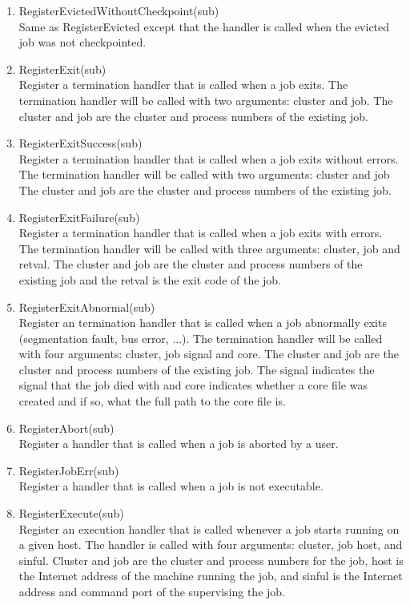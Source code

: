 \begin{enumerate}
	\item RegisterEvictedWithoutCheckpoint(sub) \\
	Same as RegisterEvicted except that the handler is called when the
	evicted job was not checkpointed.

	\item RegisterExit(sub) \\
	Register a termination handler that is called when a job exits.
	The termination handler will be called with two arguments: cluster and
	job. The cluster and job are the cluster and process numbers of the
	existing job. 
	
	\item RegisterExitSuccess(sub) \\
	Register a termination handler that is called when a job exits without
	errors. The termination handler will be called with two arguments: 
	cluster and job  The cluster and job are the cluster and process
	numbers of the existing job. 

	\item RegisterExitFailure(sub) \\
	Register a termination handler that is called when a job exits with 
	errors. The termination handler will be called with three arguments:
	cluster, job and retval. The cluster and job are the cluster 
	and process numbers of the existing job and the retval is the exit
	code of the job.

	\item RegisterExitAbnormal(sub) \\
	Register an termination handler that is called when a job abnormally
	exits (segmentation fault, bus error, ...). The termination handler
	will be called with four arguments: cluster, job  signal and
	core. The cluster and job are the cluster and process numbers of 
	the existing job. The signal indicates the signal that the job
	died with and core indicates whether a core file was created and if 
	so, what the full path to the core file is.

	\item RegisterAbort(sub) \\
	Register a handler that is called when a job is aborted by a user.

	\item RegisterJobErr(sub) \\
	Register a handler that is called when a job is not executable.

	\item RegisterExecute(sub) \\
	Register an execution handler that is called whenever a job starts
	running on a given host.  The handler is called with four arguments:
	cluster, job  host, and sinful.  Cluster and job are the cluster and
	process numbers for the job, host is the Internet address of the
	machine running the job, and sinful is the Internet address and 
	command port of the  supervising the job.


\end{enumerate}
